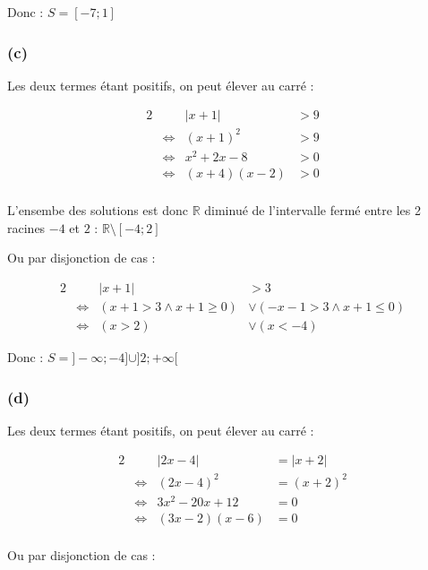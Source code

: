 \documentclass[a4paper,10pt]{report}
\begin{document}
Donc : $S=[-7 ; 1]$

\subsubsection*{(c)}


Les deux termes étant positifs, on peut élever au carré :

\begin{alignat*}{2}
	&                    & |x+1| &> 9 \\
	&\Longleftrightarrow &(x+1)^2 &> 9 \\
	&\Longleftrightarrow & x^2 + 2x -8 & >0 \\
	&\Longleftrightarrow & (x+4)(x-2) &> 0\\
\end{alignat*}

L'ensembe des solutions est donc $\mathbb{R}$ diminué de l'intervalle fermé entre les 2 racines $-4$ et $2$ : $\mathbb{R} \setminus [-4 ; 2]$

Ou par disjonction de cas :

\begin{alignat*}{2}
	&                    & |x+1| &>3  \\
	&\Longleftrightarrow &(x+1 > 3 \wedge x+1 \geq 0) &\vee (-x-1 >3 \wedge x+1 \leq 0) \\
	&\Longleftrightarrow & (x > 2) &\vee (x < -4)
\end{alignat*}

Donc : $S=]-\infty ; -4] \cup ]2 ; +\infty[$

\subsubsection*{(d)}


Les deux termes étant positifs, on peut élever au carré :

\begin{alignat*}{2}
	&                    & |2x-4| &= |x+2| \\
	&\Longleftrightarrow &(2x-4)^2 &= (x+2)^2 \\
	&\Longleftrightarrow & 3x^2 -20x +12 & =0 \\
	&\Longleftrightarrow & (3x-2)(x-6) &= 0\\
\end{alignat*}


Ou par disjonction de cas :

\end{document}

